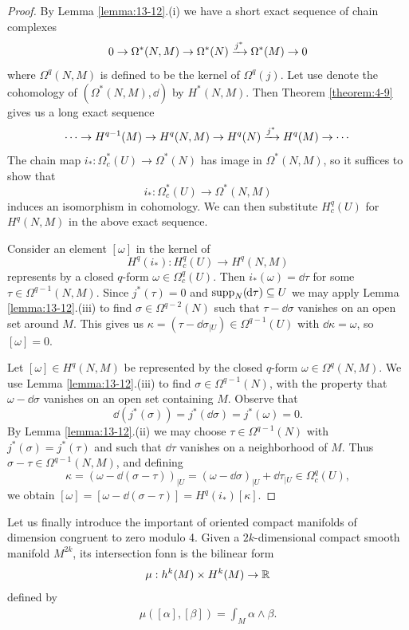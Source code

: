 \begingroup
\def\proofname{\textup{\bfseries Proof of Proposition \ref{proposition:13-11}}}
\begin{proof}
  By Lemma \ref{lemma:13-12}.(i) we have a short exact sequence of chain complexes
  \[
    0\ra\Omega^*(N, M)\ra\Omega^*(N)\xra[j^*]\Omega^*(M)\ra 0
  \]
  where $\Omega^q(N, M)$ is defined to be the kernel of $\Omega^q(j)$. Let use denote the cohomology of $(\Omega^*(N, M), \dd)$
  by $H^*(N, M)$. Then Theorem \ref{theorem:4-9} gives us a long exact sequence
  \[
    \cdots\ra H^{q-1}(M)\ra H^q(N, M)\ra H^q(N)\xra[j^*]H^q(M)\ra\cdots
  \]
  The chain map $i_*:\Omega^*_c(U)\to\Omega^*(N)$ has image in $\Omega^*(N, M)$, so it suffices to show that 
  \[
    i_*:\Omega^*_c(U)\to\Omega^*(N, M)
  \]
  induces an isomorphism in cohomology. We can then substitute $H_c^q(U)$ for $H^q(N, M)$ in the above exact sequence.

  Consider an element $[\omega]$ in the kernel of
  \[
    H^q(i_*):H_c^q(U)\to H^q(N, M)
  \]
  represents by a closed $q$-form $\omega\in\Omega_c^q(U)$. Then $i_*(\omega)=\dd\tau$ for some $\tau\in\Omega^{q-1}(N, M)$.
  Since $j^*(\tau)=0$ and $\supp_N(\!\dd\tau)\subseteq U$ we may apply Lemma \ref{lemma:13-12}.(iii) to find $\sigma\in\Omega^{q-2}(N)$
  such that $\tau-\dd\sigma$ vanishes on an open set around $M$. This gives us $\kappa=(\tau-\dd\sigma_{|U})\in\Omega^{q-1}(U)$ with 
  $\dd\kappa=\omega$, so $[\omega]=0$. 

  Let $[\omega]\in H^q(N, M)$ be represented by the closed $q$-form $\omega\in\Omega^q(N, M)$. We use Lemma \ref{lemma:13-12}.(iii)
  to find $\sigma\in\Omega^{q-1}(N)$, with the property that $\omega-\dd\sigma$ vanishes on an open set containing $M$. Observe that 
  \[
    \dd(j^*(\sigma)) = j^*(\!\dd\sigma) = j^*(\omega) = 0.
  \]
  By Lemma \ref{lemma:13-12}.(ii) we may choose $\tau\in\Omega^{q-1}(N)$ with $j^*(\sigma)=j^*(\tau)$ and such that 
  $\dd\tau$ vanishes on a neighborhood of $M$. Thus $\sigma-\tau\in\Omega^{q-1}(N, M)$, and defining 
  \[
    \kappa = (\omega-\dd(\sigma-\tau))_{|U}
    = (\omega-\dd\sigma)_{|U} + \dd\tau_{|U}
    \in \Omega_c^q(U),
  \]
  we obtain $[\omega]=[\omega-\dd(\sigma-\tau)]=H^q(i_*)[\kappa]$.
\end{proof} 
\endgroup

Let us finally introduce the important  of oriented compact
manifolds of dimension congruent to zero modulo 4. Given a $2k$-dimensional
compact smooth manifold $M^{2k}$, its intersection fonn is the bilinear form
\[
  \mu:h^k(M)\times H^k(M) \to {\ensuremath{\mathbb{R}}}
\]
defined by 
\begin{align}\label{eq:13-9}
  \mu([\alpha],[\beta]) = \int_M \alpha\wedge\beta.
\end{align}

